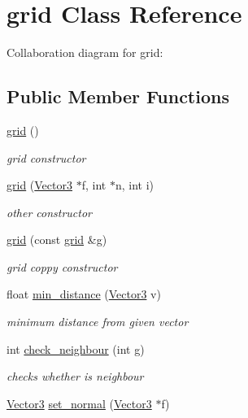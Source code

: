 \hypertarget{classgrid}{\section{grid Class Reference}
\label{classgrid}
}


Collaboration diagram for grid\+:
\subsection*{Public Member Functions}
\begin{DoxyCompactItemize}
\item 
\hypertarget{classgrid_a333b624e7bc7cc03d494ab3258b1215e}{\hyperlink{classgrid_a333b624e7bc7cc03d494ab3258b1215e}{grid} ()}\label{classgrid_a333b624e7bc7cc03d494ab3258b1215e}

\begin{DoxyCompactList}\small\item\em grid constructor \end{DoxyCompactList}\item 
\hyperlink{classgrid_abb258c486d84b0cd1add918e9b046e07}{grid} (\hyperlink{class_vector3}{Vector3} $\ast$f, int $\ast$n, int i)
\begin{DoxyCompactList}\small\item\em other constructor \end{DoxyCompactList}\item 
\hyperlink{classgrid_a142a37c799371f252af966660d9efd50}{grid} (const \hyperlink{classgrid}{grid} \&g)
\begin{DoxyCompactList}\small\item\em grid coppy constructor \end{DoxyCompactList}\item 
float \hyperlink{classgrid_aa0448f7739ea36996f01a86a85009041}{min\+\_\+distance} (\hyperlink{class_vector3}{Vector3} v)
\begin{DoxyCompactList}\small\item\em minimum distance from given vector \end{DoxyCompactList}\item 
int \hyperlink{classgrid_a47588bc719ec0342eee14e0038289c55}{check\+\_\+neighbour} (int g)
\begin{DoxyCompactList}\small\item\em checks whether is neighbour \end{DoxyCompactList}\item 
\hyperlink{class_vector3}{Vector3} \hyperlink{classgrid_aab14fbe45b1a0c2f8301bb9116b994ad}{set\+\_\+normal} (\hyperlink{class_vector3}{Vector3} $\ast$f)

\end{DoxyCompactItemize}

